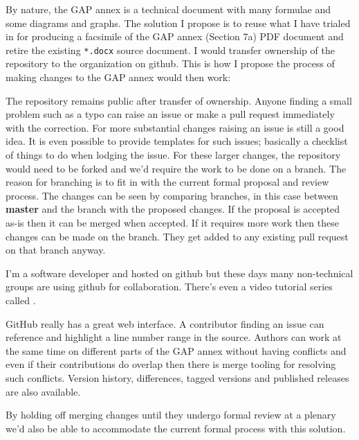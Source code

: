 \documentclass{article}
\begin{document}
By nature, the GAP annex is a technical document with many formulae and some
diagrams and graphs. The solution I propose is to reuse what I have trialed in
for producing a facsimile of the GAP annex (Section 7a) PDF document and retire
the existing \texttt{*.docx} source document. I would transfer ownership of the
 repository to the
 organization on github. This is
how I propose the process of making changes to the GAP annex would then work:

The repository remains public after transfer of ownership. Anyone finding
a small problem such as a typo can raise an issue or make a pull request
immediately with the correction. For more substantial changes raising an issue
is still a good idea. It is even possible to provide templates for such issues;
basically a checklist of things to do when lodging the issue. For these larger
changes, the repository would need to be forked and we'd require the work to be
done on a branch. The reason for branching is to fit in with the current formal
proposal and review process.  The changes can be seen by comparing branches, in
this case between \textbf{master} and the branch with the proposed changes. If
the proposal is accepted as-is then it can be merged when accepted. If it
requires more work then these changes can be made on the branch. They get added
to any existing pull request on that branch anyway.

I'm a software developer and  hosted on github but these days many non-technical groups are
using github for collaboration.  There's even a video tutorial series called
.

GitHub really has a great web interface. A contributor finding an issue can
reference and highlight a line number range in the source. Authors can work at
the same time on different parts of the GAP annex without having conflicts and
even if their contributions do overlap then there is merge tooling for
resolving such conflicts.  Version history, differences, tagged versions and
published releases are also available.

By holding off merging changes until they undergo formal review at a plenary
we'd also be able to accommodate the current formal process with this solution.
\end{document}
